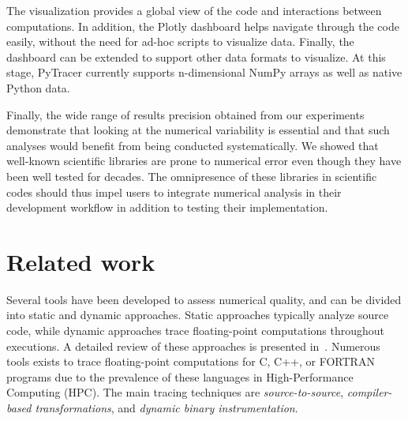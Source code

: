 \documentclass[10pt,journal,compsoc]{IEEEtran}
\newcommand{\pytracer}[0]{PyTracer\xspace}
\DeclareRobustCommand{\remove}[1]{}
\begin{document}
The visualization provides a global view of the code and interactions between
computations. In addition, the Plotly dashboard helps navigate through the code
easily, without the need for ad-hoc scripts to visualize data. Finally, the
dashboard can be extended to support other data formats to visualize. At this
stage, \pytracer currently supports n-dimensional NumPy arrays as well as native
Python data. 

\remove{
    As we showed in Section~\ref{sec:impact_mca_modes}, using Full MCA mode leads to
    runtime errors that have a considerable impact on the proper functioning of the
    execution, which is unfortunate since these errors do not reflect actual
    numerical errors but are related to perturbations that should not occur.
    Conversely, RR mode is far more conservative since it preserves exact operations
    and is easier to use even though it does not simulate all perturbations.
    Therefore, from our experiments, we recommend the use of RR over Full MCA. More
    research is required to address the issues encountered with Full MCA. 
}


Finally, the wide range of results precision obtained from our experiments
demonstrate that looking at the numerical variability is essential and that such
analyses would benefit from being conducted systematically. We showed that
well-known scientific libraries are prone to numerical error even though they
have been well tested for decades. The omnipresence of these libraries in
scientific codes should thus impel users to integrate numerical analysis in
their development workflow in addition to testing their implementation.

\section{Related work}

Several tools have been developed to assess numerical quality, and can be
divided into static and dynamic approaches. Static approaches typically analyze
source code, while dynamic approaches trace floating-point computations
throughout executions. A detailed review of these approaches is presented
in~\cite{cherubin2020tools}. 
Numerous tools exists to trace floating-point computations for C, C++, or
FORTRAN programs due to the prevalence of these languages in High-Performance
Computing (HPC). The main tracing techniques are \textit{source-to-source},
\textit{compiler-based transformations}, and \textit{dynamic binary
    instrumentation}.
\end{document}
